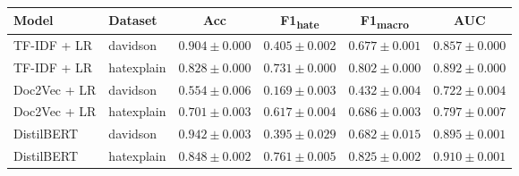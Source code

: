 \begin{tabular}{llcccc}
\toprule
Model & Dataset & Acc & F1\textsubscript{hate} & F1\textsubscript{macro} & AUC \\
\midrule
TF-IDF + LR & davidson & $0.904 \pm 0.000$ & $0.405 \pm 0.002$ & $0.677 \pm 0.001$ & $0.857 \pm 0.000$ \\
TF-IDF + LR & hatexplain & $0.828 \pm 0.000$ & $0.731 \pm 0.000$ & $0.802 \pm 0.000$ & $0.892 \pm 0.000$ \\
Doc2Vec + LR & davidson & $0.554 \pm 0.006$ & $0.169 \pm 0.003$ & $0.432 \pm 0.004$ & $0.722 \pm 0.004$ \\
Doc2Vec + LR & hatexplain & $0.701 \pm 0.003$ & $0.617 \pm 0.004$ & $0.686 \pm 0.003$ & $0.797 \pm 0.007$ \\
DistilBERT & davidson & $0.942 \pm 0.003$ & $0.395 \pm 0.029$ & $0.682 \pm 0.015$ & $0.895 \pm 0.001$ \\
DistilBERT & hatexplain & $0.848 \pm 0.002$ & $0.761 \pm 0.005$ & $0.825 \pm 0.002$ & $0.910 \pm 0.001$ \\
\bottomrule
\end{tabular}
